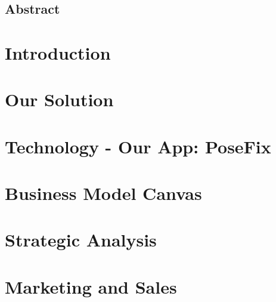 \documentclass[a4paper, 11pt]{report}
\begin{document}
    

	{
		\FloatBarrier
		\newpage
        \setcounter{page}{2}
		\thispagestyle{plain}
		\vspace*{\fill}
			\section*{{\Large Abstract}}
			
		\vspace*{\fill}
	}

    {
        \FloatBarrier
        \newpage
        \tableofcontents
    }

	{
		\FloatBarrier
		\chapter{Introduction}
		\label{chp:introduction}
		
	}

	{
		\FloatBarrier
		\chapter{Our Solution}
		\label{chp:solution}
		
	}

	{
		\FloatBarrier
		\chapter{Technology - Our App: PoseFix}
		\label{chp:technology}
		
	}

	{
		\FloatBarrier
		\chapter{Business Model Canvas}
		\label{chp:business_model_canvas}
		
	}

	{
		\FloatBarrier
		\chapter{Strategic Analysis}
		\label{chp:strategic_analysis}
		
	}

	{
		\FloatBarrier
		\chapter{Marketing and Sales}
		\label{chp:marketing}
		
	}
\end{document}
